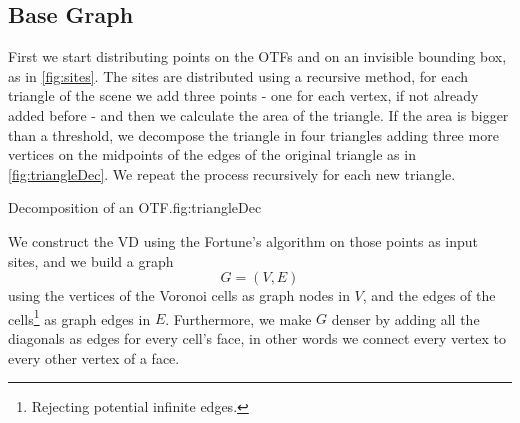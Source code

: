 \documentclass[dissertation.tex]{subfiles}
\begin{document}
\subsection{Base Graph}\label{sec:baseGraph}
First we
start distributing points on the \acp{OTF} and on
an invisible bounding box, as in \cref{fig:sites}.
The sites are distributed using a recursive method, for each triangle
of the scene we add three points - one for each
vertex, if not already added before - and then we calculate the area
of the triangle. If the area is bigger than a threshold, we decompose
the triangle in four triangles adding three more vertices on the
midpoints of the edges of the original triangle as in
\cref{fig:triangleDec}. We repeat the process recursively for
each new triangle.
\begin{myfig}{Decomposition of an \ac{OTF}.}{fig:triangleDec}
\end{myfig}

We construct the \ac{VD} using the Fortune's algorithm
\cite{fortune} on
those points as input sites, and we build a graph
$$G=(V,E)$$
using the vertices
of the Voronoi cells as graph nodes in $V$, and the edges of the cells\footnote{Rejecting potential
  infinite edges.} as graph edges in $E$. Furthermore, we make $G$
denser by adding all the diagonals as edges for every cell's face, in
other words we
connect every vertex to every other vertex of a face.
\end{document}
